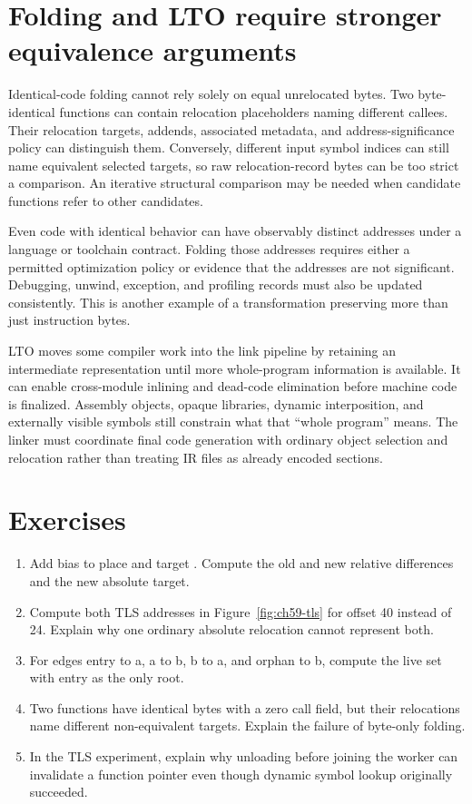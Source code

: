 \section{Folding and LTO require stronger equivalence arguments}
\label{sec:ch59-transforms}

Identical-code folding cannot rely solely on equal unrelocated bytes.
Two byte-identical functions can contain relocation placeholders naming different callees.
Their relocation targets, addends, associated metadata, and address-significance policy can distinguish them.
Conversely, different input symbol indices can still name equivalent selected targets, so raw relocation-record bytes can be too strict a comparison.
An iterative structural comparison may be needed when candidate functions refer to other candidates.

Even code with identical behavior can have observably distinct addresses under a language or toolchain contract.
Folding those addresses requires either a permitted optimization policy or evidence that the addresses are not significant.
Debugging, unwind, exception, and profiling records must also be updated consistently.
This is another example of a transformation preserving more than just instruction bytes.

LTO moves some compiler work into the link pipeline by retaining an intermediate representation until more whole-program information is available.
It can enable cross-module inlining and dead-code elimination before machine code is finalized.
Assembly objects, opaque libraries, dynamic interposition, and externally visible symbols still constrain what that \enquote{whole program} means.
The linker must coordinate final code generation with ordinary object selection and relocation rather than treating IR files as already encoded sections.

\section{Exercises}
\label{sec:ch59-exercises}
\begin{enumerate}
\item\label{ex:ch59-bias} Add bias  to place  and target . Compute the old and new relative differences and the new absolute target.
\item\label{ex:ch59-tls} Compute both TLS addresses in Figure~\ref{fig:ch59-tls} for offset 40 instead of 24. Explain why one ordinary absolute relocation cannot represent both.
\item\label{ex:ch59-gc} For edges entry to a, a to b, b to a, and orphan to b, compute the live set with entry as the only root.
\item\label{ex:ch59-fold} Two functions have identical bytes with a zero call field, but their relocations name different non-equivalent targets. Explain the failure of byte-only folding.
\item\label{ex:ch59-lifetime} In the TLS experiment, explain why unloading before joining the worker can invalidate a function pointer even though dynamic symbol lookup originally succeeded.
\end{enumerate}

